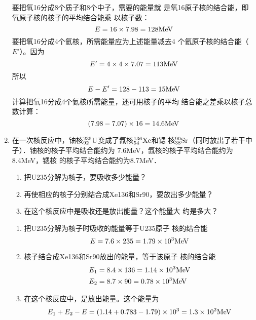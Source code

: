 \begin{enumerate}
\begin{solution}
要把氧16分成8个质子和8个中子，需要的能量就
是氧16原子核的结合能，即氧原子核的核子的平均结合能乘
以核子数：
\[E=16\x7.98=128{\rm MeV}\]
要把氧16分成4个氦核，所需能量应为上述能量减去4
个氦原子核的结合能（$E'$）。因为
\[E'=4\x4\x7.07=113{\rm MeV}\]
所以
\[E-E'=128-113=15{\rm MeV}\]
计算把氧16分成4个氦核所需能量，还可用核子的平均
结合能之差乘以核子总数计算：
\[(7.98-7.07)\x16=14.6{\rm MeV}\]
\end{solution}
\item 在一次核反应中，铀核$\atom{U}{235}{92}$变成了氙核$\atom{Xe}{136}{54}$和锶
核$\atom{Sr}{90}{38}$（同时放出了若干中子）．铀核的核子平均结合能约为
7.6MeV，氙核的核子平均结合能约为8.4MeV，锶核
的核子平均结合能约为8.7MeV．
\begin{enumerate}
    \item 把U235分解为核子，要吸收多少能量？
    \item 再使相应的核子分别结合成Xe136和Sr90，要放出多少能量？
    \item 在这个核反应中是吸收还是放出能量？这个能量大
约是多大？
\end{enumerate}

\begin{solution}
\begin{enumerate}
    \item 把U235分解为核子时吸收的能量等于U235原子
    核的结合能
\[E=7.6\x235=1.79\x10^3{\rm MeV}\]
\item 核子结合成Xe136和Sr90放出的能量，等于该原子
核的结合能
\[\begin{split}
    E_1&=8.4\x136=1.14\x10^3{\rm MeV}\\
E_2&=8.7\x90=0.78\x10^3{\rm MeV}
\end{split}\]
\item 在这个核反应中，是放出能量。这个能量为
\[E_1+E_2-E=(1.14+0.783-1.79)\x 10^3=1.3\x 10^2 {\rm MeV}\]
\end{enumerate}
\end{solution}
\end{enumerate}




